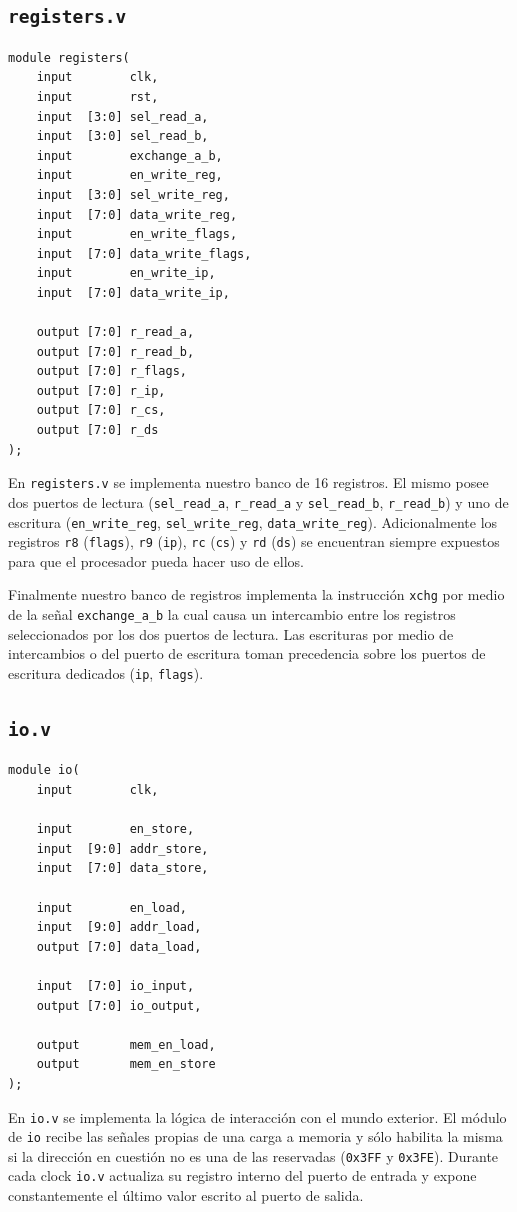 \documentclass{article}
\begin{document}
\subsection{\texttt{registers.v}}
\begin{verbatim}
module registers(
    input        clk,
    input        rst,
    input  [3:0] sel_read_a,
    input  [3:0] sel_read_b,
    input        exchange_a_b,
    input        en_write_reg,
    input  [3:0] sel_write_reg,
    input  [7:0] data_write_reg,
    input        en_write_flags,
    input  [7:0] data_write_flags,
    input        en_write_ip,
    input  [7:0] data_write_ip,

    output [7:0] r_read_a,
    output [7:0] r_read_b,
    output [7:0] r_flags,
    output [7:0] r_ip,
    output [7:0] r_cs,
    output [7:0] r_ds
);
\end{verbatim}
En \texttt{registers.v} se implementa nuestro banco de 16 registros. El mismo posee dos puertos de lectura (\texttt{sel\_read\_a}, \texttt{r\_read\_a} y \texttt{sel\_read\_b}, \texttt{r\_read\_b}) y uno de escritura (\texttt{en\_write\_reg}, \texttt{sel\_write\_reg}, \texttt{data\_write\_reg}). Adicionalmente los registros \texttt{r8} (\texttt{flags}), \texttt{r9} (\texttt{ip}), \texttt{rc} (\texttt{cs}) y \texttt{rd} (\texttt{ds}) se encuentran siempre expuestos para que el procesador pueda hacer uso de ellos.

Finalmente nuestro banco de registros implementa la instrucción \texttt{xchg} por medio de la señal \texttt{exchange\_a\_b} la cual causa un intercambio entre los registros seleccionados por los dos puertos de lectura. Las escrituras por medio de intercambios o del puerto de escritura toman precedencia sobre los puertos de escritura dedicados (\texttt{ip}, \texttt{flags}).

\subsection{\texttt{io.v}}
\begin{verbatim}
module io(
    input        clk,

    input        en_store,
    input  [9:0] addr_store,
    input  [7:0] data_store,

    input        en_load,
    input  [9:0] addr_load,
    output [7:0] data_load,
    
    input  [7:0] io_input,
    output [7:0] io_output,

    output       mem_en_load,
    output       mem_en_store
);
\end{verbatim}
En \texttt{io.v} se implementa la lógica de interacción con el mundo exterior. El módulo de \texttt{io} recibe las señales propias de una carga a memoria y sólo habilita la misma si la dirección en cuestión no es una de las reservadas (\texttt{0x3FF} y \texttt{0x3FE}). Durante cada clock \texttt{io.v} actualiza su registro interno del puerto de entrada y expone constantemente el último valor escrito al puerto de salida.
\end{document}
